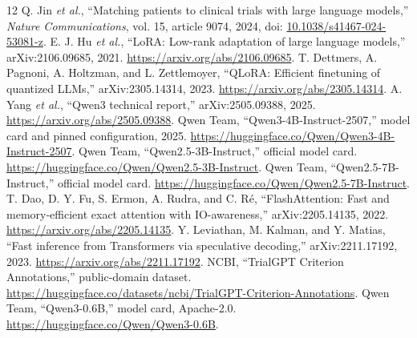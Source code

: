 \documentclass[conference]{IEEEtran}
\begin{document}
\begin{thebibliography}{12}
 Q. Jin \emph{et al.}, ``Matching patients to clinical trials with large language models,'' \emph{Nature Communications}, vol. 15, article 9074, 2024, doi: \href{https://doi.org/10.1038/s41467-024-53081-z}{10.1038/s41467-024-53081-z}.
 E. J. Hu \emph{et al.}, ``LoRA: Low-rank adaptation of large language models,'' arXiv:2106.09685, 2021. \url{https://arxiv.org/abs/2106.09685}.
 T. Dettmers, A. Pagnoni, A. Holtzman, and L. Zettlemoyer, ``QLoRA: Efficient finetuning of quantized LLMs,'' arXiv:2305.14314, 2023. \url{https://arxiv.org/abs/2305.14314}.
 A. Yang \emph{et al.}, ``Qwen3 technical report,'' arXiv:2505.09388, 2025. \url{https://arxiv.org/abs/2505.09388}.
 Qwen Team, ``Qwen3-4B-Instruct-2507,'' model card and pinned configuration, 2025. \url{https://huggingface.co/Qwen/Qwen3-4B-Instruct-2507}.
 Qwen Team, ``Qwen2.5-3B-Instruct,'' official model card. \url{https://huggingface.co/Qwen/Qwen2.5-3B-Instruct}.
 Qwen Team, ``Qwen2.5-7B-Instruct,'' official model card. \url{https://huggingface.co/Qwen/Qwen2.5-7B-Instruct}.
 T. Dao, D. Y. Fu, S. Ermon, A. Rudra, and C. R\'e, ``FlashAttention: Fast and memory-efficient exact attention with IO-awareness,'' arXiv:2205.14135, 2022. \url{https://arxiv.org/abs/2205.14135}.
 Y. Leviathan, M. Kalman, and Y. Matias, ``Fast inference from Transformers via speculative decoding,'' arXiv:2211.17192, 2023. \url{https://arxiv.org/abs/2211.17192}.
 NCBI, ``TrialGPT Criterion Annotations,'' public-domain dataset. \url{https://huggingface.co/datasets/ncbi/TrialGPT-Criterion-Annotations}.
 Qwen Team, ``Qwen3-0.6B,'' model card, Apache-2.0. \url{https://huggingface.co/Qwen/Qwen3-0.6B}.
\end{thebibliography}
\end{document}
